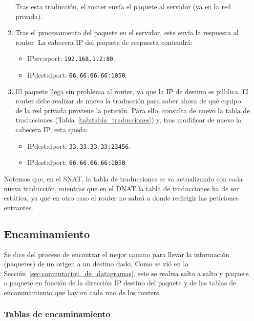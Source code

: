 \begin{ejemplo}
\begin{enumerate}[label=(\arabic*)]
        Tras esta traducción, el router envía el paquete al servidor (ya en la red privada).
        
        \item Tras el procesamiento del paquete en el servidor, este envía la respuesta al router. La cabecera IP del paquete de respuesta contendrá:
            \begin{itemize}
                \item {IPsrc}:{sport}: \verb|192.168.1.2:80|.
                \item {IPdest}:{dport}: \verb|66.66.66.66:1050|.
            \end{itemize}
        
        \item El paquete llega sin problema al router, ya que la IP de destino es pública. El router debe realizar de nuevo la traducción para saber ahora de qué equipo de la red privada proviene la petición. Para ello, consulta de nuevo la tabla de traducciones (Tabla~\ref{tab:tabla_traducciones}) y, tras modificar de nuevo la cabecera IP, esta queda:
            \begin{itemize}
                \item {IPdest}:{dport}: \verb|33.33.33.33:23456|.
                \item {IPdest}:{dport}: \verb|66.66.66.66:1050|.
            \end{itemize}
    \end{enumerate}

    Notemos que, en el \acrshort{SNAT}, la tabla de traducciones se va actualizando con cada nueva traducción, mientras que en el \acrshort{DNAT} la tabla de traducciones ha de ser estática, ya que en otro caso el router no sabrá a donde redirigir las peticiones entrantes.
\end{ejemplo}

\subsection{Encaminamiento}
Se dice del proceso de encontrar el mejor camino para llevar la información (paquetes) de un origen a un destino dado. Como se vió en la Sección~\ref{sec:conmutacion_de_datagramas}, este se realiza salto a salto y paquete a paquete en función de la dirección IP destino del paquete y de las tablas de encaminamiento que hay en cada uno de los routers.

\subsubsection{Tablas de encaminamiento}

